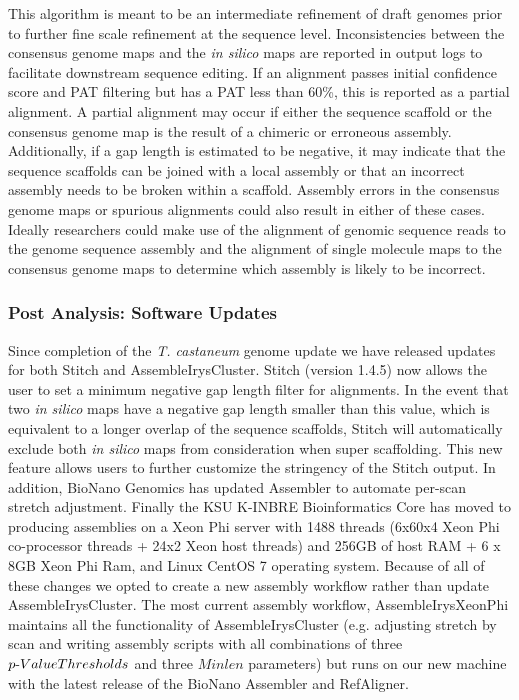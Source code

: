 \documentclass{bmcart}
\begin{document}
This algorithm is meant to be an intermediate refinement of draft genomes prior to further fine scale refinement at the sequence level. Inconsistencies between the consensus genome maps and the \textit{in silico} maps are reported in output logs to facilitate downstream sequence editing. If an alignment passes initial confidence score and PAT filtering but has a PAT less than 60\%, this is reported as a partial alignment. A partial alignment may occur if either the sequence scaffold or the consensus genome map is the result of a chimeric or erroneous assembly. Additionally, if a gap length is estimated to be negative, it may indicate that the sequence scaffolds can be joined with a local assembly or that an incorrect assembly needs to be broken within a scaffold. Assembly errors in the consensus genome maps or spurious alignments could also result in either of these cases. Ideally researchers could make use of the alignment of genomic sequence reads to the genome sequence assembly and the alignment of single molecule maps to the consensus genome maps to determine which assembly is likely to be incorrect.

\subsubsection*{Post Analysis: Software Updates}

Since completion of the \textit{T. castaneum} genome update we have released updates for both Stitch and AssembleIrysCluster. Stitch (version 1.4.5) now allows the user to set a minimum negative gap length filter for alignments. In the event that two \textit{in silico} maps have a negative gap length smaller than this value, which is equivalent to a longer overlap of the sequence scaffolds, Stitch will automatically exclude both \textit{in silico} maps from consideration when super scaffolding. This new feature allows users to further customize the stringency of the Stitch output. In addition, BioNano Genomics has updated Assembler to automate per-scan stretch adjustment. Finally the KSU K-INBRE Bioinformatics Core has moved to producing assemblies on a Xeon Phi server with 1488 threads (6x60x4 Xeon Phi co-processor threads + 24x2 Xeon host threads) and 256GB of host RAM + 6 x 8GB Xeon Phi Ram, and Linux CentOS 7 operating system. Because of all of these changes we opted to create a new assembly workflow rather than update AssembleIrysCluster. The most current assembly workflow, AssembleIrysXeonPhi maintains all the functionality of AssembleIrysCluster (e.g. adjusting stretch by scan and writing assembly scripts with all combinations of three $p\textnormal{-}Value Thresholds$ and three $Minlen$ parameters) but runs on our new machine with the latest release of the BioNano Assembler and RefAligner.
\end{document}
